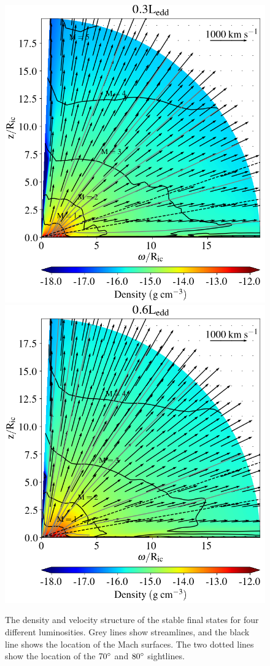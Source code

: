 \documentclass[a4paper,fleqn,usenatbib]{mnras}
\begin{document}
\begin{figure}
\includegraphics[width=\columnwidth]{figures/fig3c_density.png}
\includegraphics[width=\columnwidth]{figures/fig3d_density.png}
\caption{The density and velocity structure of the stable final states for 
four different luminosities. Grey lines show streamlines, and the black line shows the location of the Mach surfaces. The two dotted
lines show the location of the $70\degree$ and $80\degree$ sightlines.}
\label{figure:wind_small_image}
\end{figure}
\end{document}
